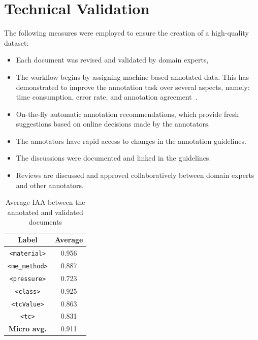 \label{sec:technical-validation}
\section{Technical Validation} 
The following measures were employed to ensure the creation of a high-quality dataset: 
\begin{itemize}
    \item Each document was revised and validated by domain experts, 
    \item The workflow begins by assigning machine-based annotated data. This has demonstrated to improve the annotation task over several aspects, namely: time consumption, error rate, and annotation agreement~\cite{Fort2010InfluenceOP,Nvol2011SemiautomaticSA,Lingren2014EvaluatingTI}.
    \item On-the-fly automatic annotation recommendations, which provide fresh suggestions based on online decisions made by the annotators.
    \item The annotators have rapid access to changes in the annotation guidelines.
    \item The discussions were documented and linked in the guidelines. 
    \item Reviews are discussed and approved collaboratively between domain experts and other annotators.
\end{itemize}

\begin{table}[htbp]
    \centering
    \caption{Average IAA between the annotated and validated documents}
    \begin{tabular}{ c|c } 
    \toprule
        \textbf{Label} & \textbf{Average}\\
    \midrule
        \texttt{<material>}     &   0.956   \\
        \texttt{<me\_method>}   &	0.887   \\
        \texttt{<pressure>}     &	0.723   \\
        \texttt{<class>}        &	0.925   \\
        \texttt{<tcValue>}      &	0.863   \\
        \texttt{<tc>}           &	0.831   \\
    \midrule
        \textbf{Micro avg.}     &	0.911	\\
    \bottomrule
    \end{tabular}
    
    \label{table:average-iaa}
\end{table}

